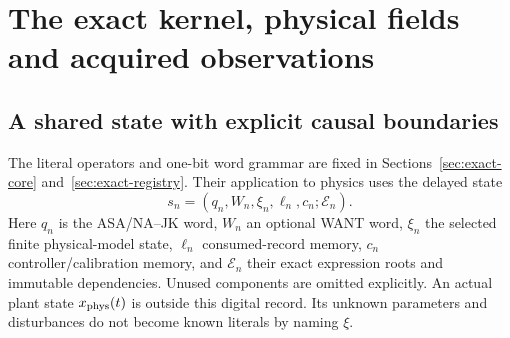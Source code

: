 \section{The exact kernel, physical fields and acquired observations}
\label{sec:r14-kernel-bridge}

\subsection{A shared state with explicit causal boundaries}
The literal operators and one-bit word grammar are fixed in
Sections~\ref{sec:exact-core} and~\ref{sec:exact-registry}. Their application to
physics uses the delayed state
\begin{equation}
 s_n=(q_n,W_n,\xi_n,\ell_n,c_n;\mathcal E_n).
 \label{eq:r14-shared-state}
\end{equation}
Here $q_n$ is the ASA/NA--JK word, $W_n$ an optional WANT word, $\xi_n$ the
selected finite physical-model state, $\ell_n$ consumed-record memory, $c_n$
controller/calibration memory, and $\mathcal E_n$ their exact expression roots
and immutable dependencies. Unused components are omitted explicitly. An actual
plant state $x_{\rm phys}(t)$ is outside this digital record. Its unknown
parameters and disturbances do not become known literals by naming $\xi$.

